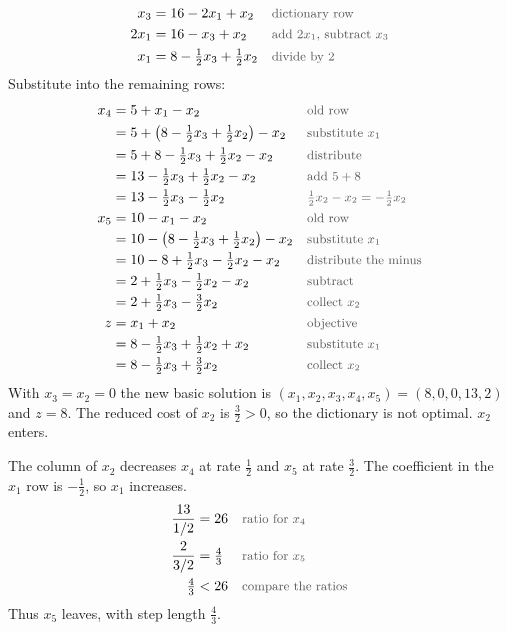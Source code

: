 \documentclass[a4paper,11pt]{article}
\newif\ifexplain
\newcommand{\why}[1]{\text{\small\color{black!65}#1}}
\newcommand{\explain}[1]{\ifexplain\begin{erklbox}#1\end{erklbox}\fi}
\begin{document}
\begin{align*}
x_3&=16-2x_1+x_2&&\why{dictionary row}\\
2x_1&=16-x_3+x_2&&\why{add $2x_1$, subtract $x_3$}\\
x_1&=8-\tfrac12 x_3+\tfrac12 x_2&&\why{divide by $2$}
\end{align*}
Substitute into the remaining rows:
\begin{align*}
x_4&=5+x_1-x_2&&\why{old row}\\
&=5+\bigl(8-\tfrac12 x_3+\tfrac12 x_2\bigr)-x_2&&\why{substitute $x_1$}\\
&=5+8-\tfrac12 x_3+\tfrac12 x_2-x_2&&\why{distribute}\\
&=13-\tfrac12 x_3+\tfrac12 x_2-x_2&&\why{add $5+8$}\\
&=13-\tfrac12 x_3-\tfrac12 x_2&&\why{$\tfrac12 x_2-x_2=-\tfrac12 x_2$}\\
x_5&=10-x_1-x_2&&\why{old row}\\
&=10-\bigl(8-\tfrac12 x_3+\tfrac12 x_2\bigr)-x_2&&\why{substitute $x_1$}\\
&=10-8+\tfrac12 x_3-\tfrac12 x_2-x_2&&\why{distribute the minus}\\
&=2+\tfrac12 x_3-\tfrac12 x_2-x_2&&\why{subtract}\\
&=2+\tfrac12 x_3-\tfrac32 x_2&&\why{collect $x_2$}\\
z&=x_1+x_2&&\why{objective}\\
&=8-\tfrac12 x_3+\tfrac12 x_2+x_2&&\why{substitute $x_1$}\\
&=8-\tfrac12 x_3+\tfrac32 x_2&&\why{collect $x_2$}
\end{align*}
With $x_3=x_2=0$ the new basic solution is $(x_1,x_2,x_3,x_4,x_5)=(8,0,0,13,2)$ and $z=8$. The reduced cost of $x_2$ is $\tfrac32>0$, so the dictionary is not optimal. $x_2$ enters.
\explain{Der erste Schritt läuft auf der $x_1$-Achse, bis die erste Nebenbedingung aktiv wird. $x_4$ und $x_5$ bleiben positiv. $x_2$ hat danach immer noch positive reduzierte Kosten, also lohnt ein zweiter Pivot. Noch nicht optimal.}
The column of $x_2$ decreases $x_4$ at rate $\tfrac12$ and $x_5$ at rate $\tfrac32$. The coefficient in the $x_1$ row is $-\tfrac12$, so $x_1$ increases.
\begin{align*}
\frac{13}{1/2}&=26&&\why{ratio for $x_4$}\\
\frac{2}{3/2}&=\tfrac43&&\why{ratio for $x_5$}\\
\tfrac43&<26&&\why{compare the ratios}
\end{align*}
Thus $x_5$ leaves, with step length $\tfrac43$.
\end{document}
